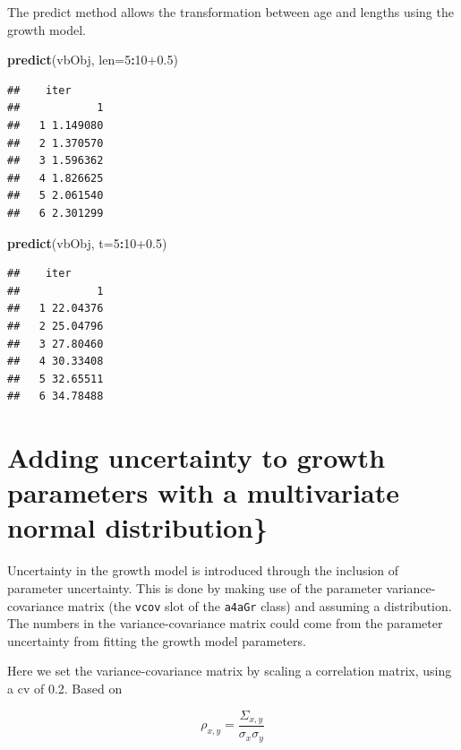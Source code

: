 \documentclass[
]{book}
\newenvironment{Shaded}{\begin{snugshade}}{\end{snugshade}}
\newcommand{\AttributeTok}[1]{\textcolor[rgb]{0.13,0.29,0.53}{#1}}
\newcommand{\DecValTok}[1]{\textcolor[rgb]{0.00,0.00,0.81}{#1}}
\newcommand{\FloatTok}[1]{\textcolor[rgb]{0.00,0.00,0.81}{#1}}
\newcommand{\FunctionTok}[1]{\textcolor[rgb]{0.13,0.29,0.53}{\textbf{#1}}}
\newcommand{\NormalTok}[1]{#1}
\newcommand{\SpecialCharTok}[1]{\textcolor[rgb]{0.81,0.36,0.00}{\textbf{#1}}}
\begin{document}
The predict method allows the transformation between age and lengths using the growth model.

\begin{Shaded}
\begin{Highlighting}[]
\FunctionTok{predict}\NormalTok{(vbObj, }\AttributeTok{len=}\DecValTok{5}\SpecialCharTok{:}\DecValTok{10}\FloatTok{+0.5}\NormalTok{)}
\end{Highlighting}
\end{Shaded}

\begin{verbatim}
##    iter
##            1
##   1 1.149080
##   2 1.370570
##   3 1.596362
##   4 1.826625
##   5 2.061540
##   6 2.301299
\end{verbatim}

\begin{Shaded}
\begin{Highlighting}[]
\FunctionTok{predict}\NormalTok{(vbObj, }\AttributeTok{t=}\DecValTok{5}\SpecialCharTok{:}\DecValTok{10}\FloatTok{+0.5}\NormalTok{)}
\end{Highlighting}
\end{Shaded}

\begin{verbatim}
##    iter
##            1
##   1 22.04376
##   2 25.04796
##   3 27.80460
##   4 30.33408
##   5 32.65511
##   6 34.78488
\end{verbatim}

\hypertarget{adding-uncertainty-to-growth-parameters-with-a-multivariate-normal-distribution}{%
\section{Adding uncertainty to growth parameters with a multivariate normal distribution\}}\label{adding-uncertainty-to-growth-parameters-with-a-multivariate-normal-distribution}}

Uncertainty in the growth model is introduced through the inclusion of parameter uncertainty.
This is done by making use of the parameter variance-covariance matrix (the \texttt{vcov} slot of the \texttt{a4aGr} class) and assuming a distribution. The numbers in the variance-covariance matrix could come from the parameter uncertainty from fitting the growth model parameters.

Here we set the variance-covariance matrix by scaling a correlation matrix, using a cv of 0.2. Based on

\[\rho_{x,y}=\frac{\Sigma_{x,y}}{\sigma_x \sigma_y}\]
\end{document}

